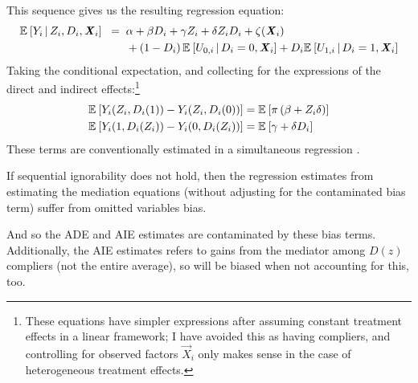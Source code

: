 This sequence gives us the resulting regression equation:
\begin{align*}
    \mathbb{E}_{} \left[ Y_i \, \middle\vert \, Z_i, D_i, \boldsymbol{\mathit{X}}_i \right] \;\; =& \;\;
        \alpha
        + \beta D_i
        + \gamma Z_i
        + \delta Z_i D_i
        + \zeta(\boldsymbol{\mathit{X}}_i) \\
        & \;\; +\left( 1 - D_i \right) \mathbb{E}_{} \left[  U_{0,i}  \, \middle\vert \, D_i = 0, \boldsymbol{\mathit{X}}_i \right]
            + D_i \mathbb{E}_{} \left[  U_{1,i}  \, \middle\vert \, D_i = 1, \boldsymbol{\mathit{X}}_i \right]
\end{align*}
Taking the conditional expectation, and collecting for the expressions of the direct and indirect effects:\footnote{
    These equations have simpler expressions after assuming constant treatment effects in a linear framework;
    I have avoided this as having compliers, and controlling for observed factors $\vec X_i$ only makes sense in the case of heterogeneous treatment effects.
}
\begin{align*}
    \mathbb{E}_{} \left[ Y_i(Z_i, D_i(1)) - Y_i(Z_i, D_i(0)) \right]
        &= \mathbb{E}_{} \left[ \pi \left( \beta +  Z_i \delta \right) \right] \\
    \mathbb{E}_{} \left[ Y_i(1, D_i(Z_i)) - Y_i(0, D_i(Z_i)) \right]
        &= \mathbb{E}_{} \left[ \gamma + \delta D_i \right]
\end{align*}
These terms are conventionally estimated in a simultaneous regression \citep{imai2010identification}.

If sequential ignorability does not hold, then the regression estimates from estimating the mediation equations (without adjusting for the contaminated bias term) suffer from omitted variables bias.

And so the ADE and AIE estimates are contaminated by these bias terms.
Additionally, the AIE estimates refers to gains from the mediator among $D(z)$ compliers (not the entire average), so will be biased when not accounting for this, too.

